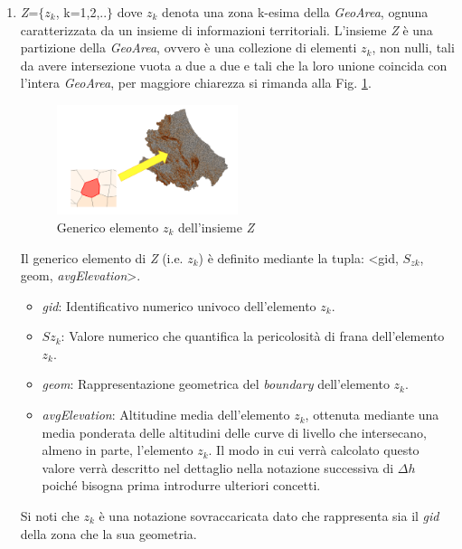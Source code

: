 \begin{enumerate}
\item\textit{Z}=$\{${$z_k$}, k=1,2,..$\}$ dove $z_k$ denota una zona k-esima della \textit{GeoArea}, ognuna caratterizzata da un insieme di informazioni territoriali. L'insieme \textit{Z} è una partizione della \textit{GeoArea}, ovvero è una collezione di elementi $z_k$, non nulli, tali da avere intersezione vuota a due a due e tali che la loro unione coincida con l'intera \textit{GeoArea}, per maggiore chiarezza si rimanda alla Fig. \ref{fig:geoarea}.  
\begin{figure}[h]
\centering
\includegraphics[width=0.5\textwidth]{img/zeta}
\caption{Generico elemento $z_k$ dell'insieme \textit{Z}}
	\label{fig:geoarea}
\end{figure}
\newpage
Il generico elemento di \textit{Z} (i.e. $z_k$) è definito mediante la tupla: <gid, $S_{zk}$, geom, \textit{avgElevation}>.
\begin{itemize}
\item \textit{gid}: Identificativo numerico univoco dell'elemento $z_k$.
\item \textit{$Sz_k$}: Valore numerico che quantifica la pericolosità di frana dell'elemento $z_k$. 
\item \textit{geom}: Rappresentazione geometrica del \textit{boundary} dell'elemento $z_k$.

\item \textit{avgElevation}: Altitudine media dell'elemento $z_k$, ottenuta mediante una media ponderata delle altitudini delle curve di livello che intersecano, almeno in parte, l'elemento $z_k$. Il modo in cui verrà calcolato questo valore verrà descritto nel dettaglio nella notazione successiva di $\Delta{h}$ poiché bisogna prima introdurre ulteriori concetti.
\end{itemize}
Si noti che $z_k$ è una notazione sovraccaricata dato che rappresenta sia il \textit{gid} della zona che la sua geometria.


\end{enumerate}
